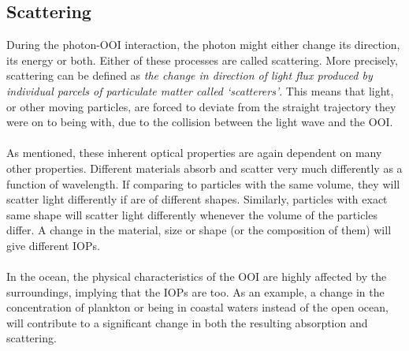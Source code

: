 \subsection{Scattering}
During the photon-OOI interaction, the photon might either change its direction, its energy or both. Either of these processes are called scattering. %
More precisely, scattering can be defined as \textit{the change in direction of light flux produced by individual parcels of particulate matter called ‘scatterers’}. This means that light, or other moving particles, are forced to deviate from the straight trajectory they were on to being with, due to the collision between the light wave and the OOI. 
\\\\
As mentioned, these inherent optical properties are again dependent on many other properties. Different materials absorb and scatter very much differently as a function of wavelength. If comparing to particles with the same volume, they will scatter light differently if are of different shapes. Similarly, particles with exact same shape will scatter light differently whenever the volume of the particles differ. A change in the material, size or shape (or the composition of them) will give different IOPs. \cite{williams_1973}
\\\\
In the ocean, the physical characteristics of the OOI are highly affected by the surroundings, implying that the IOPs are too. As an example, a change in the concentration of plankton or being in coastal waters instead of the open ocean, will contribute to a significant change in both the resulting absorption and scattering. 


